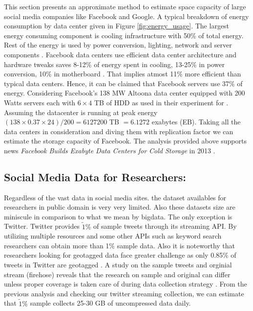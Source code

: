 This section presents an approximate method to estimate space capacity of large social media companies like Facebook and Google.
A typical breakdown of energy consumption by data center given in Figure \ref{fig:energy_usage}.
The largest energy consuming component is cooling infrastructure with 50\% of total energy. Rest of the energy is used by power conversion, lighting, network and server components \cite{info2007top, dayarathna2016data}. Facebook data centers use efficient data center architecture and hardware tweaks  saves
8-12\% of energy spent in cooling, 13-25\% in power conversion, 10\% in motherboard \cite{frachtenberg2011high}. That implies atmost 11\%  more efficient than typical data centers. Hence, it can be claimed that Facebook servers use 37\% of energy. Considering Facebook's 138 MW Altoona data center equipped with 200 Watts servers each with $6\times4$ TB of HDD as used in their experiment for \cite{frachtenberg2011high}. Assuming the datacenter is running at peak energy $(138 \times 0.37 \times 24)/ 200 = 6127200$  TB $= 6.1272$ exabytes (EB).
Taking all the data centers in consideration and diving them with replication factor we can estimate the storage capacity of Facebook. The analysis provided above supports news {\em Facebook Builds Exabyte Data Centers for Cold Storage} in 2013 \cite{facebook_support}.


\subsection*{Social Media Data for Researchers:}
Regardless of the vast data in social media sites. the dataset availables for researchers in public domain is very very limited. Also these datasets size are miniscule in comparison to what we mean by bigdata. The only exception is Twitter. Twitter provides $\tilde 1\%$ of sample tweets through its streaming API. By utilizing multiple resources and some other APIs such as keyword search researchers can obtain more than 1\% sample data. Also it is noteworthy that researchers looking for geotagged data face greater challenge as only 0.85\% of tweets in Twitter are geotagged \cite{sloan2013knowing}. A study on the sample tweets and orginial stream (firehose) reveals that the research on sample and original can differ unless proper coverage is taken care of during data collection strategy  \cite{morstatter2013sample}. From the previous analysis and checking our twitter streaming collection, we can estimate that $\tilde 1\%$ sample collects 25-30 GB of uncompressed data daily.

